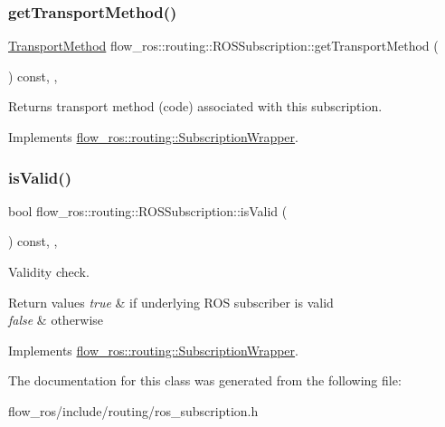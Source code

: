 \subsubsection{\texorpdfstring{get\+Transport\+Method()}{getTransportMethod()}}
{\footnotesize\ttfamily \hyperlink{transport__info_8h_ae57afcf849a5bdb82b958347c6ccc57b}{Transport\+Method} flow\+\_\+ros\+::routing\+::\+R\+O\+S\+Subscription\+::get\+Transport\+Method (\begin{DoxyParamCaption}{ }\end{DoxyParamCaption}) const\hspace{0.3cm}{\ttfamily [inline]}, {\ttfamily [override]}, {\ttfamily [virtual]}}



Returns transport method (code) associated with this subscription. 



Implements \hyperlink{classflow__ros_1_1routing_1_1_subscription_wrapper_a063fcc10600ef657620e2b58ce1fca85}{flow\+\_\+ros\+::routing\+::\+Subscription\+Wrapper}.

\mbox{\label{classflow__ros_1_1routing_1_1_r_o_s_subscription_a5f845fe965a9b166b02a87ffbb00e6ac}} 
\subsubsection{\texorpdfstring{is\+Valid()}{isValid()}}
{\footnotesize\ttfamily bool flow\+\_\+ros\+::routing\+::\+R\+O\+S\+Subscription\+::is\+Valid (\begin{DoxyParamCaption}{ }\end{DoxyParamCaption}) const\hspace{0.3cm}{\ttfamily [inline]}, {\ttfamily [override]}, {\ttfamily [virtual]}}



Validity check. 


\begin{DoxyRetVals}{Return values}
{\em true} & if underlying R\+OS subscriber is valid \\
\hline
{\em false} & otherwise \\
\hline
\end{DoxyRetVals}


Implements \hyperlink{classflow__ros_1_1routing_1_1_subscription_wrapper_a0f23052807c3533d28168d7c681a221e}{flow\+\_\+ros\+::routing\+::\+Subscription\+Wrapper}.



The documentation for this class was generated from the following file\+:\begin{DoxyCompactItemize}
\item 
flow\+\_\+ros/include/routing/ros\+\_\+subscription.\+h\end{DoxyCompactItemize}
